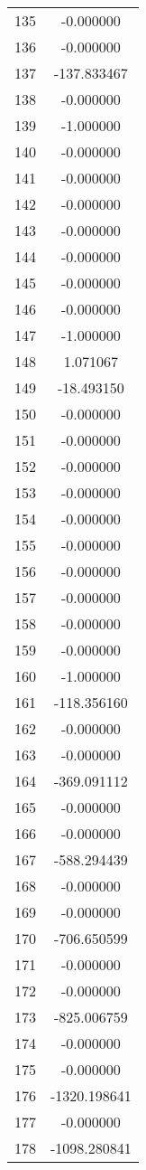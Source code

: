 \documentclass[12pt]{article}
\begin{document}
\begin{longtable}{@{}cc@{}}
135 & -0.000000 \\
136 & -0.000000 \\
137 & -137.833467 \\
138 & -0.000000 \\
139 & -1.000000 \\
140 & -0.000000 \\
141 & -0.000000 \\
142 & -0.000000 \\
143 & -0.000000 \\
144 & -0.000000 \\
145 & -0.000000 \\
146 & -0.000000 \\
147 & -1.000000 \\
148 & 1.071067 \\
149 & -18.493150 \\
150 & -0.000000 \\
151 & -0.000000 \\
152 & -0.000000 \\
153 & -0.000000 \\
154 & -0.000000 \\
155 & -0.000000 \\
156 & -0.000000 \\
157 & -0.000000 \\
158 & -0.000000 \\
159 & -0.000000 \\
160 & -1.000000 \\
161 & -118.356160 \\
162 & -0.000000 \\
163 & -0.000000 \\
164 & -369.091112 \\
165 & -0.000000 \\
166 & -0.000000 \\
167 & -588.294439 \\
168 & -0.000000 \\
169 & -0.000000 \\
170 & -706.650599 \\
171 & -0.000000 \\
172 & -0.000000 \\
173 & -825.006759 \\
174 & -0.000000 \\
175 & -0.000000 \\
176 & -1320.198641 \\
177 & -0.000000 \\
178 & -1098.280841 \\

\end{longtable}
\end{document}
